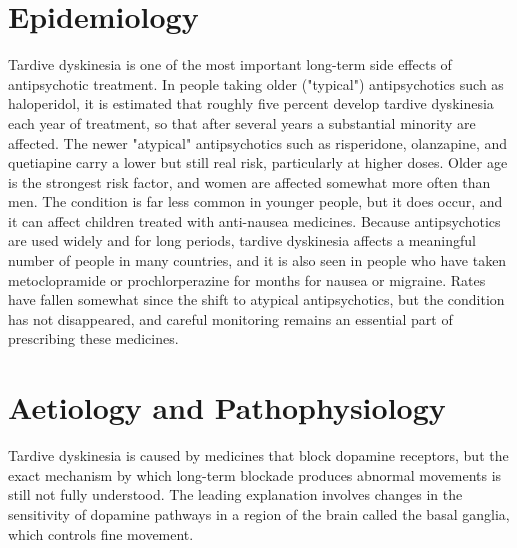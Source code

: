 \section*{Epidemiology}
Tardive dyskinesia is one of the most important long-term side effects of antipsychotic treatment. In people taking older ("typical") antipsychotics such as haloperidol, it is estimated that roughly five percent develop tardive dyskinesia each year of treatment, so that after several years a substantial minority are affected. The newer "atypical" antipsychotics such as risperidone, olanzapine, and quetiapine carry a lower but still real risk, particularly at higher doses. Older age is the strongest risk factor, and women are affected somewhat more often than men. The condition is far less common in younger people, but it does occur, and it can affect children treated with anti-nausea medicines. Because antipsychotics are used widely and for long periods, tardive dyskinesia affects a meaningful number of people in many countries, and it is also seen in people who have taken metoclopramide or prochlorperazine for months for nausea or migraine. Rates have fallen somewhat since the shift to atypical antipsychotics, but the condition has not disappeared, and careful monitoring remains an essential part of prescribing these medicines.

\section*{Aetiology and Pathophysiology}
Tardive dyskinesia is caused by medicines that block dopamine receptors, but the exact mechanism by which long-term blockade produces abnormal movements is still not fully understood. The leading explanation involves changes in the sensitivity of dopamine pathways in a region of the brain called the basal ganglia, which controls fine movement.

